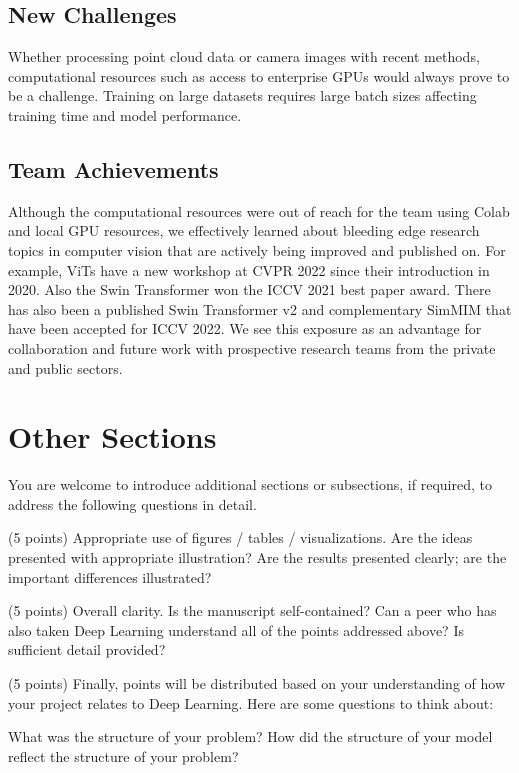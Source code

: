 \documentclass[10pt,twocolumn,letterpaper]{article}
\begin{document}
\subsection{New Challenges}

Whether processing point cloud data or camera images with recent methods, computational resources such as access to enterprise GPUs would always prove to be a challenge. Training on large datasets requires large batch sizes affecting training time and model performance.

\subsection{Team Achievements}

Although the computational resources were out of reach for the team using Colab and local GPU resources, we effectively learned about bleeding edge research topics in computer vision that are actively being improved and published on. For example, ViTs have a new workshop at CVPR 2022 since their introduction in 2020. Also the Swin Transformer won the ICCV 2021 best paper award. There has also been a published Swin Transformer v2 and complementary SimMIM that have been accepted for ICCV 2022. We see this exposure as an advantage for collaboration and future work with prospective research teams from the private and public sectors.

\section{Other Sections}

You are welcome to introduce additional sections or subsections, if required, to address the following questions in detail. 

(5 points) Appropriate use of figures / tables / visualizations. Are the ideas presented with appropriate illustration? Are the results presented clearly; are the important differences illustrated? 

(5 points) Overall clarity. Is the manuscript self-contained? Can a peer who has also taken Deep Learning understand all of the points addressed above? Is sufficient detail provided? 

(5 points) Finally, points will be distributed based on your understanding of how your project relates to Deep Learning. Here are some questions to think about: 

What was the structure of your problem? How did the structure of your model reflect the structure of your problem? 
\end{document}
